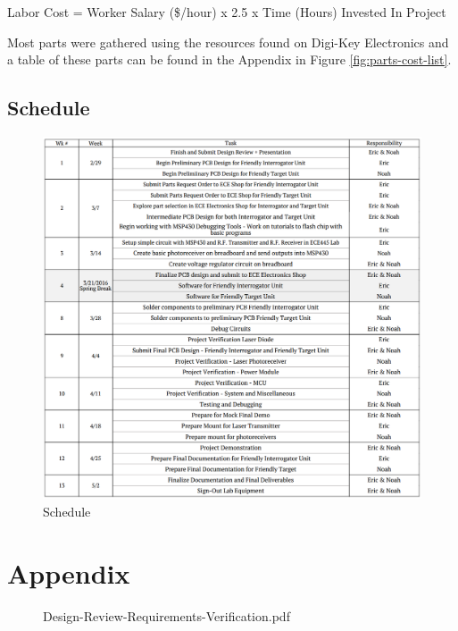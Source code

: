 \documentclass[letterpaper,10pt]{article}
\begin{document}
\begin{spacing}{1.15}
\begin{center}
	Labor Cost = Worker Salary (\$/hour) x 2.5 x Time (Hours) Invested In Project
\end{center}

Most parts were gathered using the resources found on Digi-Key Electronics and a table of these parts can be found in the Appendix in Figure \ref{fig:parts-cost-list}. \\

\subsection{Schedule}

\begin{figure} [H]
	\centering
	\includegraphics[scale=0.63]{Schedule_Extended.png}
	\caption{Schedule\label{fig:extended-schedule}}
\end{figure}


\clearpage

\clearpage
\section*{Appendix}
\begin{figure} [H]
	\centering
	 {Design-Review-Requirements-Verification.pdf}
\end{figure}
\clearpage


\end{spacing}
\end{document}

